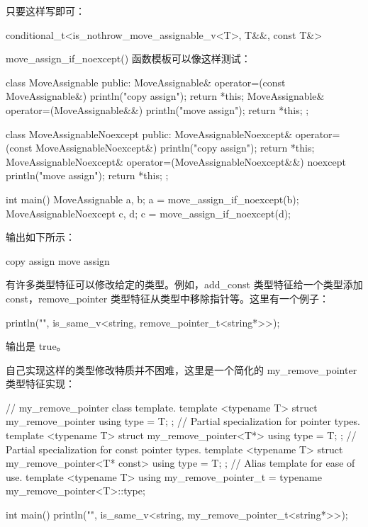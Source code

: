 只要这样写即可：

\begin{cpp}
conditional_t<is_nothrow_move_assignable_v<T>, T&&, const T&>
\end{cpp}

move\_assign\_if\_noexcept() 函数模板可以像这样测试：

\begin{cpp}
class MoveAssignable
{
    public:
        MoveAssignable& operator=(const MoveAssignable&) {
            println("copy assign"); return *this; }
        MoveAssignable& operator=(MoveAssignable&&) {
            println("move assign"); return *this; }
};

class MoveAssignableNoexcept
{
    public:
        MoveAssignableNoexcept& operator=(const MoveAssignableNoexcept&) {
            println("copy assign"); return *this; }
        MoveAssignableNoexcept& operator=(MoveAssignableNoexcept&&) noexcept {
            println("move assign"); return *this; }
};

int main()
{
    MoveAssignable a, b;
    a = move_assign_if_noexcept(b);
    MoveAssignableNoexcept c, d;
    c = move_assign_if_noexcept(d);
}
\end{cpp}

输出如下所示：

\begin{shell}
copy assign
move assign
\end{shell}


有许多类型特征可以修改给定的类型。例如，add\_const 类型特征给一个类型添加 const，remove\_pointer 类型特征从类型中移除指针等。这里有一个例子：

\begin{cpp}
println("{}", is_same_v<string, remove_pointer_t<string*>>);
\end{cpp}

输出是 true。

自己实现这样的类型修改特质并不困难，这里是一个简化的 my\_remove\_pointer 类型特征实现：

\begin{cpp}
// my_remove_pointer class template.
template <typename T> struct my_remove_pointer { using type = T; };
// Partial specialization for pointer types.
template <typename T> struct my_remove_pointer<T*> { using type = T; };
// Partial specialization for const pointer types.
template <typename T> struct my_remove_pointer<T* const> { using type = T; };
// Alias template for ease of use.
template <typename T>
using my_remove_pointer_t = typename my_remove_pointer<T>::type;

int main()
{
    println("{}", is_same_v<string, my_remove_pointer_t<string*>>);
}
\end{cpp}

